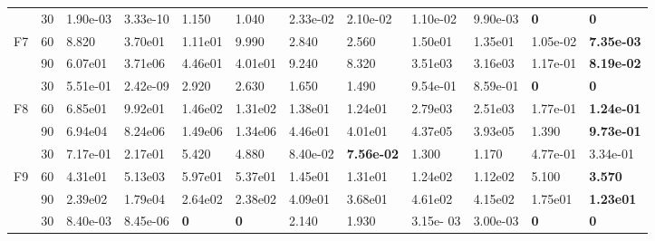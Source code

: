 \begin{table}
\begin{center}
\begin{tabular}{p{0.3in} | p{0.4in} | p{0.6in} |  p{0.6in} |  p{0.6in}|  p{0.6in} |  p{0.6in} | p{0.6in} |  p{0.6in} | p{0.6in} |  p{0.6in} |  p{0.6in}}
\hline                                    
    &    30    &    1.90e-03    &{    3.33e-10    }&    1.150    &    1.040    &    2.33e-02    &    2.10e-02    &    1.10e-02    &    9.90e-03    &    \textbf{    0    }&    \textbf{    0    }\\
F7    &    60    &    8.820    &    3.70e01    &    1.11e01    &    9.990    &    2.840    &{    2.560    }&    1.50e01    &    1.35e01    &    {    1.05e-02    }&    \textbf{    7.35e-03    }\\
    &    90    &    6.07e01    &    3.71e06    &    4.46e01    &    4.01e01    &    9.240    &{    8.320    }&    3.51e03    &    3.16e03    &    {    1.17e-01    }&    \textbf{    8.19e-02    }\\        
\hline                                                
    &    30    &    5.51e-01    &{    2.42e-09    }&    2.920    &    2.630    &    1.650    &    1.490    &    9.54e-01    &    8.59e-01    &    \textbf{    0    }&    \textbf{    0    }\\
F8    &    60    &    6.85e01    &    9.92e01    &    1.46e02    &    1.31e02    &    1.38e01    &{    1.24e01    }&    2.79e03    &    2.51e03    &    {    1.77e-01    }&    \textbf{    1.24e-01    }\\
    &    90    &    6.94e04    &    8.24e06    &    1.49e06    &    1.34e06    &    4.46e01    &{    4.01e01    }&    4.37e05    &    3.93e05    &    {    1.390    }&    \textbf{    9.73e-01    }\\                                                        \hline            
    &    30    &    7.17e-01    &    2.17e01    &    5.420    &    4.880    &{    8.40e-02    }&\textbf{    7.56e-02    }&    1.300    &    1.170    &            4.77e-01    &    {    3.34e-01    }\\
F9    &    60    &    4.31e01    &    5.13e03    &    5.97e01    &    5.37e01    &    1.45e01    &{    1.31e01    }&    1.24e02    &    1.12e02    &    {    5.100    }&    \textbf{    3.570    }\\
    &    90    &    2.39e02    &    1.79e04    &    2.64e02    &    2.38e02    &    4.09e01    &{    3.68e01    }&    4.61e02    &    4.15e02    &    {    1.75e01    }&    \textbf{    1.23e01    }\\
\hline                                                                                                    
    &    30    &    8.40e-03    &    8.45e-06    &\textbf{    0    }&\textbf{    0    }&    2.140    &    1.930    &    3.15e- 03    &    3.00e-03    &    \textbf{    0    }&    \textbf{    0    }\\

\end{tabular}
\end{center}
\end{table}
